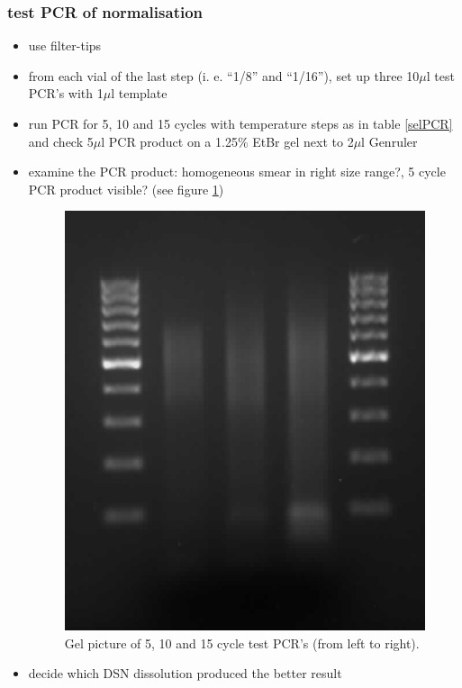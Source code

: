 \subsubsection
{test PCR of normalisation}
\begin{itemize}
\item {\color{red}use filter-tips}
\item from each vial of the last step (i. e. ``1/8'' and ``1/16''), set up three 10$\mu$l test PCR's with 1$\mu$l template
\item run PCR for 5, 10 and 15 cycles with temperature steps as in table \ref{selPCR} and check 5$\mu$l PCR product on a 1.25\% EtBr gel next to 2$\mu$l Genruler
\item examine the PCR product: homogeneous smear in right size range?, 5 cycle PCR product visible? (see figure \ref{NormTestPCR})

\begin{figure}[!htb]
\begin{center}
\includegraphics[scale=0.4]{Normalisation_test_lib_PCR_28072011}
\caption{Gel picture of 5, 10 and 15 cycle test PCR's (from left to right).}
\label{NormTestPCR}
\end{center}
\end{figure}

\item decide which DSN dissolution produced the better result
\end{itemize}

